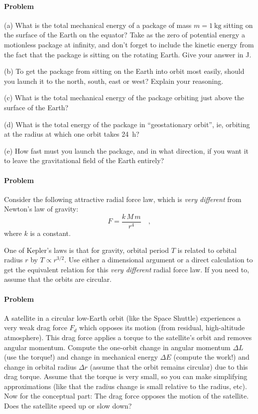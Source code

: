 \documentclass[12pt]{article}
\newcounter{problem}
\begin{document}
\paragraph{Problem~\theproblem}

(a) What is the total mechanical energy of a package of mass $m=
1~\mathrm{kg}$ sitting on the surface of the Earth on the equator?
Take as the zero of potential energy a motionless package at infinity,
and don't forget to include the kinetic energy from the fact that the
package is sitting on the rotating Earth.  Give your answer in J.

(b) To get the package from sitting on the Earth into orbit most
easily, should you launch it to the north, south, east or west?
Explain your reasoning.

(c) What is the total mechanical energy of the package orbiting just
above the surface of the Earth? 

(d) What is the total energy of the package in ``geostationary
orbit'', ie, orbiting at the radius at which one orbit takes 24~h?

(e) How fast must you launch the package, and in what direction, if
you want it to leave the gravitational field of the Earth entirely?

\paragraph{Problem~\theproblem}

Consider the following attractive radial force law, which is
\emph{very different} from Newton's law of gravity:
\begin{equation}
F = \frac{k\,M\,m}{r^4} \quad ,
\end{equation}
where $k$ is a constant.

One of Kepler's laws is that for gravity, orbital period $T$ is
related to orbital radius $r$ by $T\propto r^{3/2}$.  Use either a
dimensional argument or a direct calculation to get the equivalent
relation for this \emph{very different} radial force law.  If you need
to, assume that the orbits are circular.

\paragraph{Problem~\theproblem}

A satellite in a circular low-Earth orbit (like the Space Shuttle)
experiences a very weak drag force $F_d$ which opposes its motion
(from residual, high-altitude atmosphere).  This drag force applies a
torque to the satellite's orbit and removes angular momentum.  Compute
the one-orbit change in angular momentum $\Delta L$ (use the torque!)
and change in mechanical energy $\Delta E$ (compute the work!) and
change in orbital radius $\Delta r$ (assume that the orbit remains
circular) due to this drag torque.  Assume that the torque is very
small, so you can make simplifying approximations (like that the
radius change is small relative to the radius, etc).  Now for the
conceptual part: The drag force opposes the motion of the satellite.
Does the satellite speed up or slow down?
\end{document}
